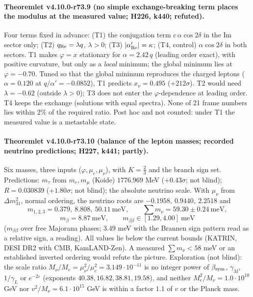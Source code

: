 \paragraph{Theoremlet v4.10.0-r73.9 (no simple exchange-breaking term places the modulus at the measured value; H226, k440; refuted).}
Four terms fixed in advance: (T1) the conjugation term \(c\,\alpha\cos2\delta\) in the Im sector only; (T2) \(q_{\rm Re}=\lambda q\), \(\lambda>0\); (T3)
\(|\alpha'_{\rm Re}|=\kappa\); (T4, control) \(\alpha\cos2\delta\) in both sectors.  T1 makes \(\varphi=x\) stationary for \(\alpha=2.42\,q\) (leading order
exact), with positive curvature, but only as a \emph{local} minimum; the global minimum lies at \(\varphi=-0.70\).  Tuned so that the global
minimum reproduces the charged leptons (\(\alpha=0.120\) at \(q/\alpha'=-0.0852\)), T1 predicts \(x_\nu=0.495\) (\(+212\sigma\)).  T2 would need
\(\lambda=-0.62\) (outside \(\lambda>0\)); T3 does not enter the \(\varphi\)-dependence at leading order.  T4 keeps the exchange (solutions with equal
spectra).  None of 21 frame numbers lies within \(2\%\) of the required ratio.  Post hoc and not counted: under T1 the measured value is a
metastable state.

\paragraph{Theoremlet v4.10.0-r73.10 (balance of the lepton masses; recorded neutrino predictions; H227, k441; partly).}
Six masses, three inputs (\(\varphi,\mu_e,\mu_\nu\)), with \(K=\tfrac23\) and the branch sign set.  Predictions: \(m_\tau\) from \(m_e,m_\mu\)
(Koide) \(1776.969\) MeV (\(+0.43\sigma\); not blind); \(R=0.030839\) (\(+1.80\sigma\); not blind); the absolute neutrino scale.  With \(\mu_\nu\) from
\(\Delta m^2_{31}\), normal ordering, the neutrino roots are \(-0.1958,\ 0.9440,\ 2.2518\) and
\[
m_{1,2,3}=0.379,\ 8.808,\ 50.11\ \text{meV},\qquad
\textstyle\sum m_\nu=59.30\pm0.24\ \text{meV},
\]
\[
m_\beta=8.87\ \text{meV},\qquad
m_{\beta\beta}\in[1.29,4.00]\ \text{meV}
\]
(\(m_{\beta\beta}\) over free Majorana phases; \(3.49\) meV with the Brannen sign pattern read as a relative sign, a reading).  All values lie below
the current bounds (KATRIN, DESI DR2 with CMB, KamLAND-Zen).  A measured \(\sum m_\nu<58\) meV or an established inverted ordering would refute the
picture.  Exploration (not blind): the scale ratio \(M_\nu/M_e=\mu_\nu^2/\mu_e^2=3.149\cdot10^{-11}\) is no integer power of \(\beta_{\rm sym}\),
\(\gamma_M\), \(1/\gamma_L\) or \(e^{-2\varepsilon}\) (exponents \(40.38,16.82,38.81,19.58\)), and neither \(M_e^2/M_\nu=1.0\cdot10^{10}\) GeV nor
\(v^2/M_\nu=6.1\cdot10^{15}\) GeV is within a factor \(1.1\) of \(v\) or the Planck mass.


